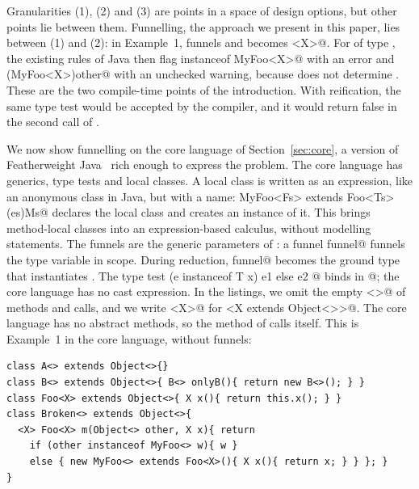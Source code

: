 Granularities (1), (2) and (3) are points in a space of design options,
but other points lie between them.
Funnelling, the approach we present in this paper, lies between (1) and (2):
in Example~1, \Q@MyFoo@ funnels \Q@X@ and becomes \Q@MyFoo<X>@.
For \Q@other@ of type \Q@Object@, the existing rules of Java then flag \Q@other instanceof MyFoo<X>@ with an error and \Q@(MyFoo<X>)other@ with an unchecked warning, because \Q@Object@ does not determine \Q@X@.
These are the two compile-time points of the introduction.
With reification, the same type test would be accepted by the compiler, and it would return false in the second call of \Q@m@.

We now show funnelling on the core language of Section~\ref{sec:core}, a version of Featherweight Java~\cite{fj} rich enough to express the problem.
The core language has generics, type tests and local classes.
A local class is written as an expression, like an anonymous class in Java, but with a name:
\Q@new MyFoo<Fs> extends Foo<Ts>(es){Ms}@ declares the local class \Q@MyFoo@ and creates an instance of it.
This brings method-local classes into an expression-based calculus, without modelling statements.
The funnels \Q@Fs@ are the generic parameters of \Q@MyFoo@: a funnel \Q@X funnel@ funnels the type variable \Q@X@ in scope.
During reduction, \Q@X funnel@ becomes the ground type that instantiates \Q@X@.
The type test \Q@if (e instanceof T x){ e1 } else { e2 }@ binds \Q@x@ in @; the core language has no cast expression.
In the listings, we omit the empty \Q@<>@ of methods and calls, and we write \Q@<X>@ for \Q@<X extends Object<>>@.
The core language has no abstract methods, so the method \Q@x@ of \Q@Foo@ calls itself.
This is Example~1 in the core language, without funnels:

\medskip\noindent\begin{minipage}{\linewidth}
\begin{lstlisting}
class A<> extends Object<>{}
class B<> extends Object<>{ B<> onlyB(){ return new B<>(); } }
class Foo<X> extends Object<>{ X x(){ return this.x(); } }
class Broken<> extends Object<>{
  <X> Foo<X> m(Object<> other, X x){ return
    if (other instanceof MyFoo<> w){ w }
    else { new MyFoo<> extends Foo<X>(){ X x(){ return x; } } }; }
}
\end{lstlisting}
\end{minipage}

